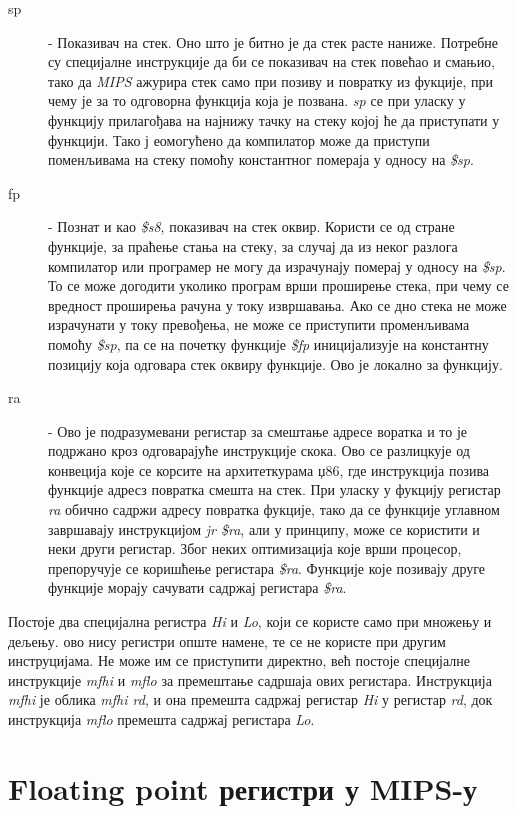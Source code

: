 \documentclass[12pt,oneside]{memoir}
\begin{document}
\begin{description}
  \item[sp] - Показивач на стек. Оно што је битно је да стек расте наниже. Потребне су специјалне инструкције да би се показивач на стек повећао и смањио, тако да \textit{MIPS} ажурира стек само при позиву и повратку из фукције, при чему је за то одговорна функција која је позвана. \textit{sp} се при уласку у функцију прилагођава на најнижу тачку на стеку којој ће да приступати у функцији. Тако ј еомогућено да компилатор може да приступи поменљивама на стеку помоћу константног помераја у односу на \textit{\$sp}.
  \item[fp] - Познат и као \textit{\$s8}, показивач на стек оквир. Користи се од стране функције, за праћење стања на стеку, за случај да из неког разлога компилатор или програмер не могу да израчунају померај у односу на \textit{\$sp}. То се може догодити уколико програм врши проширење стека, при чему се вредност проширења рачуна у току извршавања. Ако се дно стека не може израчунати у току превођења, не може се приступити променљивама помоћу \textit{\$sp}, па се на почетку функције \textit{\$fp} иницијализује на константну позицију која одговара стек оквиру функције. Ово је локално за функцију.
  \item[ra] - Ово је подразумевани регистар за смештање адресе воратка и то је подржано кроз одговарајуће инструкције скока. Ово се разлицкује од конвеција које се корсите на архитеткурама џ86, где инструкција позива функције адресз повратка смешта на стек. При уласку у фукцију регистар \textit{ra} обично садржи адресу повратка фукције, тако да се функције углавном завршавају инструкцијом \textit{jr \$ra}, али у принципу, може се користити и неки други регистар. Због неких оптимизација које врши процесор, препоручује се коришћење регистара \textit{\$ra}. Функције које позивају друге функције морају сачувати садржај регистара \textit{\$ra}.
\end{description}


\indent Постоје два специјална регистра \textit{Hi} и \textit{Lo}, који се користе само при множењу и дељењу. ово нису регистри опште намене, те се не користе при другим инструцијама. Не може им се приступити директно, већ постоје специјалне инструкције \textit{mfhi} и \textit{mflo} за премештање садршаја ових регистара. Инструкција \textit{mfhi} је облика \textit{mfhi rd}, и она премешта садржај регистар \textit{Hi} у регистар \textit{rd}, док инструкција \textit{mflo} премешта садржај регистара \textit{Lo}.


\section{Floating point регистри у MIPS-у}
\end{document}
